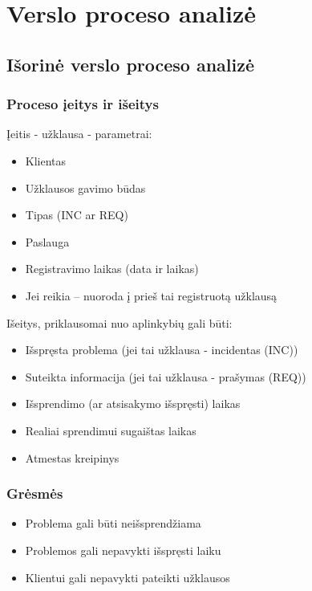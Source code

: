 \section{Verslo proceso analizė}

	\subsection{Išorinė verslo proceso analizė}

		\subsubsection{Proceso įeitys ir išeitys}

			Įeitis - užklausa - parametrai:
			\begin{itemize}
				\item Klientas
				\item Užklausos gavimo būdas
				\item Tipas (INC ar REQ)
				\item Paslauga
				\item Registravimo laikas (data ir laikas)
				\item Jei reikia – nuoroda į prieš tai registruotą užklausą
			\end{itemize}

			Išeitys, priklausomai nuo aplinkybių gali būti:
			\begin{itemize}
				\item Išspręsta problema (jei tai užklausa - incidentas (INC))
				\item Suteikta informacija (jei tai užklausa - prašymas (REQ))
				\item Išsprendimo (ar atsisakymo išspręsti) laikas
				\item Realiai sprendimui sugaištas laikas
				\item Atmestas kreipinys
			\end{itemize}

		\subsubsection{Grėsmės}
		
			\begin{itemize}
				\item Problema gali būti neišsprendžiama
				\item Problemos gali nepavykti išspręsti laiku
				\item Klientui gali nepavykti pateikti užklausos
			\end{itemize}
			
